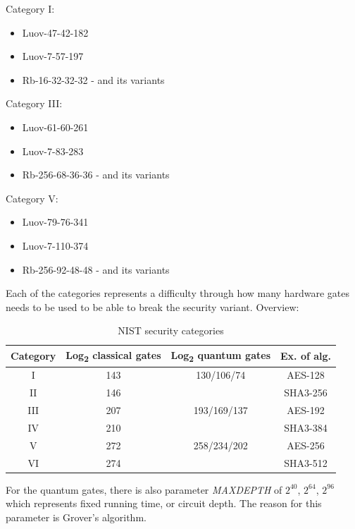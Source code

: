 \documentclass[thesis=M,english]{FITthesis}[2019/12/23]
\begin{document}
\bigskip
\noindent
Category I:
\begin{itemize}
\item Luov-47-42-182
\item Luov-7-57-197
\item Rb-16-32-32-32 - and its variants
\end{itemize}

\noindent
Category III:
\begin{itemize}
\item Luov-61-60-261
\item Luov-7-83-283
\item Rb-256-68-36-36 - and its variants
\end{itemize}

\noindent
Category V:
\begin{itemize}
\item Luov-79-76-341
\item Luov-7-110-374
\item Rb-256-92-48-48 - and its variants
\end{itemize}

\noindent
Each of the categories represents a difficulty through how many hardware gates needs to be used to be able to break the security variant.\cite{L-NIST-STANDARD} Overview:
\begin{table}[H]
\centering
\begin{tabular}{|c|c|c|c|}
\hline
Category & Log\textsubscript{2} classical gates & Log\textsubscript{2} quantum gates  & Ex. of alg.\\ \hline
I         & 143                    & 130/106/74    & AES-128     \\ \hline
II        & 146                    &                      & SHA3-256  \\ \hline
III       & 207                    & 193/169/137  & AES-192     \\ \hline
IV        & 210                    &                     & SHA3-384   \\ \hline
V         & 272                    & 258/234/202 & AES-256      \\ \hline
VI        & 274                    &                     & SHA3-512   \\ \hline
\end{tabular}
\caption{NIST security categories}
\end{table}

\noindent
For the quantum gates, there is also parameter \textit{MAXDEPTH} of $2^{40}$, $2^{64}$, $2^{96}$ which represents fixed running time, or circuit depth. The reason for this parameter is Grover’s algorithm.
\end{document}
